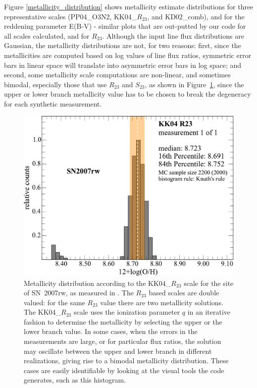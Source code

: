 \documentclass{emulateapj}
\begin{document}
Figure \ref{metallicity_distribution} shows metallicity estimate distributions for three representative scales (PP04\_O3N2, KK04\_$R_{23}$, and KD02\_comb), and for the reddening parameter E(B-V) - similar plots that are out-putted by our code for all scales calculated, and for $R_{23}$. Although the input line flux distributions are Gaussian, the metallicity distributions are not, for two reasons: first, since the metallicities are computed based on log values of line flux ratios, symmetric error bars in linear space will translate into asymmetric error bars in log space; and second, some metallicity scale computations are non-linear, and sometimes bimodal, especially those that use $R_{23}$ and $S_{23}$, as shown in Figure~\ref{metallicity_bimodal}, since the upper or lower branch metallicity value has to be chosen to break the degeneracy for each synthetic measurement.
\begin{figure}[ht!]
\includegraphics[width=1.0\columnwidth]{SN2007rw_n2000_KK04_R23_1.pdf}
\caption{Metallicity distribution according to the KK04\_$R_{23}$ scale for the site of SN~2007rw, as measured in  \citet{modjaz11}. The $R_{23}$ based scales are double valued: for the same $R_{23}$ value there are two metallicity solutions. The KK04\_$R_{23}$ scale uses the ionization parameter $q$ in an iterative fashion to determine the metallicity by selecting the upper or the lower branch value. In some cases, when the errors in the measurements are large, or for particular flux ratios, the solution may oscillate between the upper and lower branch in different realizations, giving rise to a bimodal metallicity distribution. These cases are easily identifiable by looking at the visual tools the code generates, such as this histogram.}\label{metallicity_bimodal}
\end{figure}
\end{document}
